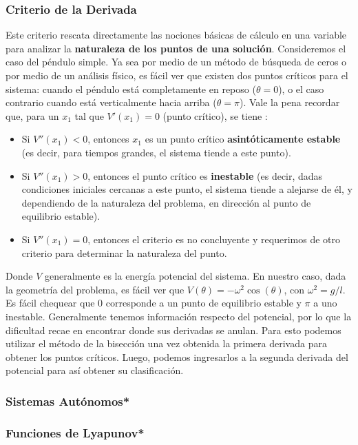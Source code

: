  \subsubsection{Criterio de la Derivada}
 Este criterio rescata directamente las nociones básicas de cálculo en una variable para analizar la \textbf{naturaleza de los puntos de una solución}. Consideremos el caso del péndulo simple. Ya sea por medio de un método de búsqueda de ceros o por medio de un análisis físico, es fácil ver que existen dos puntos críticos para el sistema: cuando el péndulo está completamente en reposo ($\theta = 0$), o el caso contrario cuando está verticalmente hacia arriba ($\theta = \pi$). Vale la pena recordar que, para un $x_1$ tal que $V'(x_1) = 0$ (punto crítico), se tiene :
 \begin{itemize}
   \item Si $V''(x_1)<0$, entonces $x_1$  es un punto crítico \textbf{asintóticamente estable} (es decir, para tiempos grandes, el sistema tiende a este punto).
   \item Si $V''(x_1)>0$, entonces el punto crítico es \textbf{inestable} (es decir, dadas condiciones iniciales cercanas a este punto, el sistema tiende a alejarse de él, y dependiendo de la naturaleza del problema, en dirección al punto de equilibrio estable).
   \item Si $V''(x_1)=0$, entonces el criterio es no concluyente y requerimos de otro criterio para determinar la naturaleza del punto.
 \end{itemize}
Donde $V$ generalmente es la energía potencial del sistema. En nuestro caso, dada la geometría del problema, es fácil ver que $V(\theta) = -\omega^2 \cos(\theta)$, con $\omega^2 = g/l$. Es fácil chequear que $0$ corresponde a un punto de equilibrio estable y $\pi$ a uno inestable. Generalmente tenemos información respecto del potencial, por lo que la dificultad recae en encontrar donde sus derivadas se anulan. Para esto podemos utilizar el método de la bisección una vez obtenida la primera derivada para obtener los puntos críticos. Luego, podemos ingresarlos a la segunda derivada del potencial para así obtener su clasificación. 
 \subsubsection{Sistemas Autónomos*}

 \subsubsection{Funciones de Lyapunov*}

